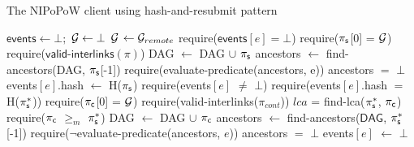 \begin{algorithm}

    \caption{\label{alg:har-nipopow}The \textsf{NIPoPoW} client using hash-and-resubmit pattern}
    \begin{algorithmic}[1]

    \State $\textsf{events} \gets \bot;$ $\mathcal{G} \gets \bot$
        \State $\mathcal{G}$ $\gets \mathcal{G}_{remote}$
    \EndFunction
        \State \textsf{require}($\textsf{events$[e]$} = \bot$)
        \State \textsf{require}($\mathsf{\pi_{s}}$[0] = $\mathcal{G}$)
        \State \textsf{require}($\textsf{valid-interlinks}(\pi)$)
        \State \textsf{DAG} $\gets$ \textsf{DAG} $\cup$ $\mathsf{\pi_{s}}$
        \State \textsf{ancestors} $\gets$ \textsf{find-ancestors(DAG, $\mathsf{\pi_{s}}$[-1])}
        \State \textsf{require}(\textsf{evaluate-predicate}(\textsf{ancestors},
        e))
        \State \textsf{ancestors} $=$ $\bot$
        \State \textsf{events$[e]$.hash} $\gets$ \textsf{H}($\mathsf{\pi_{s}}$)
        \EndFunction
        \State \textsf{require}(\textsf{events}$[e]$ $\ne$ $\bot$)
        \State \textsf{require}(\textsf{events$[e]$.hash} $=$ \textsf{H}($\mathsf{\pi_{s}^*}$))
        \State \textsf{require}($\mathsf{\pi_{c}}$[0] = $\mathcal{G}$)
        \State \textsf{require}(\textsf{valid-interlinks}($\pi_{cont}$))
        \State $lca$ = \textsf{find-lca}($\mathsf{\pi_{s}^*}$, $\mathsf{\pi_{c}}$)
        \State \textsf{require}($\mathsf{\pi_{c}}$ $\geq_m$ $\mathsf{\pi_{s}^*}$)
        \State \textsf{DAG} $\gets$ \textsf{DAG} $\cup$ $\mathsf{\pi_{c}}$
        \State \textsf{ancestors} $\gets$
        \textsf{find-ancestors}($\textsf{DAG}$, $\mathsf{\pi_{s}^*}$[-1])
        \State \textsf{require}($\neg$\textsf{evaluate-predicate}(\textsf{ancestors}, $e$))
        \State \textsf{ancestors} $=$ $\bot$
        \State \textsf{events$[e]$} $\gets$ $\bot$
    \EndFunction
    \EndContract
    \vskip8pt
    \end{algorithmic}
\end{algorithm}

